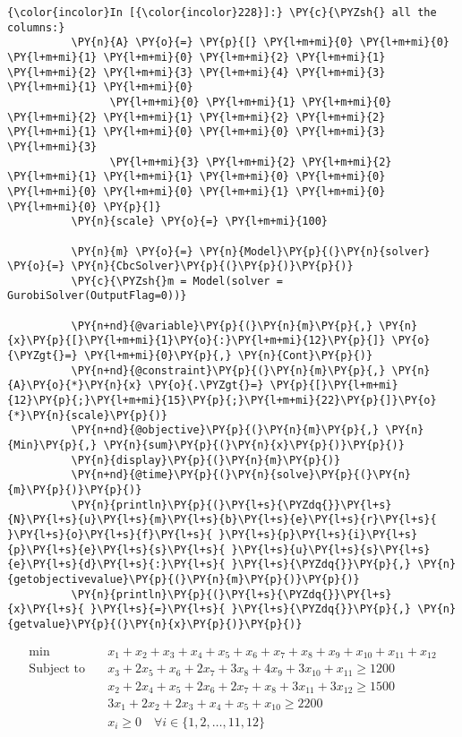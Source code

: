     \begin{Verbatim}[commandchars=\\\{\}]
{\color{incolor}In [{\color{incolor}228}]:} \PY{c}{\PYZsh{} all the columns:}
          \PY{n}{A} \PY{o}{=} \PY{p}{[} \PY{l+m+mi}{0} \PY{l+m+mi}{0} \PY{l+m+mi}{1} \PY{l+m+mi}{0} \PY{l+m+mi}{2} \PY{l+m+mi}{1} \PY{l+m+mi}{2} \PY{l+m+mi}{3} \PY{l+m+mi}{4} \PY{l+m+mi}{3} \PY{l+m+mi}{1} \PY{l+m+mi}{0}
                \PY{l+m+mi}{0} \PY{l+m+mi}{1} \PY{l+m+mi}{0} \PY{l+m+mi}{2} \PY{l+m+mi}{1} \PY{l+m+mi}{2} \PY{l+m+mi}{2} \PY{l+m+mi}{1} \PY{l+m+mi}{0} \PY{l+m+mi}{0} \PY{l+m+mi}{3} \PY{l+m+mi}{3}
                \PY{l+m+mi}{3} \PY{l+m+mi}{2} \PY{l+m+mi}{2} \PY{l+m+mi}{1} \PY{l+m+mi}{1} \PY{l+m+mi}{0} \PY{l+m+mi}{0} \PY{l+m+mi}{0} \PY{l+m+mi}{0} \PY{l+m+mi}{1} \PY{l+m+mi}{0} \PY{l+m+mi}{0} \PY{p}{]}
          \PY{n}{scale} \PY{o}{=} \PY{l+m+mi}{100}
          
          \PY{n}{m} \PY{o}{=} \PY{n}{Model}\PY{p}{(}\PY{n}{solver} \PY{o}{=} \PY{n}{CbcSolver}\PY{p}{(}\PY{p}{)}\PY{p}{)}
          \PY{c}{\PYZsh{}m = Model(solver = GurobiSolver(OutputFlag=0))}
          
          \PY{n+nd}{@variable}\PY{p}{(}\PY{n}{m}\PY{p}{,} \PY{n}{x}\PY{p}{[}\PY{l+m+mi}{1}\PY{o}{:}\PY{l+m+mi}{12}\PY{p}{]} \PY{o}{\PYZgt{}=} \PY{l+m+mi}{0}\PY{p}{,} \PY{n}{Cont}\PY{p}{)}
          \PY{n+nd}{@constraint}\PY{p}{(}\PY{n}{m}\PY{p}{,} \PY{n}{A}\PY{o}{*}\PY{n}{x} \PY{o}{.\PYZgt{}=} \PY{p}{[}\PY{l+m+mi}{12}\PY{p}{;}\PY{l+m+mi}{15}\PY{p}{;}\PY{l+m+mi}{22}\PY{p}{]}\PY{o}{*}\PY{n}{scale}\PY{p}{)}
          \PY{n+nd}{@objective}\PY{p}{(}\PY{n}{m}\PY{p}{,} \PY{n}{Min}\PY{p}{,} \PY{n}{sum}\PY{p}{(}\PY{n}{x}\PY{p}{)}\PY{p}{)}
          \PY{n}{display}\PY{p}{(}\PY{n}{m}\PY{p}{)}
          \PY{n+nd}{@time}\PY{p}{(}\PY{n}{solve}\PY{p}{(}\PY{n}{m}\PY{p}{)}\PY{p}{)}
          \PY{n}{println}\PY{p}{(}\PY{l+s}{\PYZdq{}}\PY{l+s}{N}\PY{l+s}{u}\PY{l+s}{m}\PY{l+s}{b}\PY{l+s}{e}\PY{l+s}{r}\PY{l+s}{ }\PY{l+s}{o}\PY{l+s}{f}\PY{l+s}{ }\PY{l+s}{p}\PY{l+s}{i}\PY{l+s}{p}\PY{l+s}{e}\PY{l+s}{s}\PY{l+s}{ }\PY{l+s}{u}\PY{l+s}{s}\PY{l+s}{e}\PY{l+s}{d}\PY{l+s}{:}\PY{l+s}{ }\PY{l+s}{\PYZdq{}}\PY{p}{,} \PY{n}{getobjectivevalue}\PY{p}{(}\PY{n}{m}\PY{p}{)}\PY{p}{)}
          \PY{n}{println}\PY{p}{(}\PY{l+s}{\PYZdq{}}\PY{l+s}{x}\PY{l+s}{ }\PY{l+s}{=}\PY{l+s}{ }\PY{l+s}{\PYZdq{}}\PY{p}{,} \PY{n}{getvalue}\PY{p}{(}\PY{n}{x}\PY{p}{)}\PY{p}{)}
\end{Verbatim}


\begin{equation*}\begin{split}\min\quad & x_{1} + x_{2} + x_{3} + x_{4} + x_{5} + x_{6} + x_{7} + x_{8} + x_{9} + x_{10} + x_{11} + x_{12}\\
\text{Subject to} \quad & x_{3} + 2 x_{5} + x_{6} + 2 x_{7} + 3 x_{8} + 4 x_{9} + 3 x_{10} + x_{11} \geq 1200\\
 & x_{2} + 2 x_{4} + x_{5} + 2 x_{6} + 2 x_{7} + x_{8} + 3 x_{11} + 3 x_{12} \geq 1500\\
 & 3 x_{1} + 2 x_{2} + 2 x_{3} + x_{4} + x_{5} + x_{10} \geq 2200\\
 & x_{i} \geq 0 \quad\forall i \in \{1,2,\dots,11,12\}\\
\end{split}
\end{equation*}

